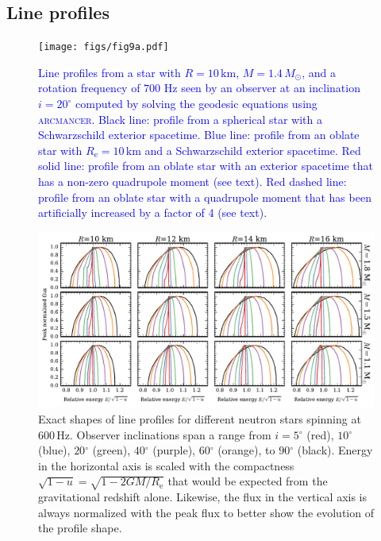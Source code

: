 \documentclass{aa}
\newcommand{\refe}[1]{\textcolor{blue}{{#1}}}
\newcommand{\Msun}{\ensuremath{M_{\odot}}}
\renewcommand{\deg}{\ensuremath{^{\circ}}}
\begin{document}
\subsection{Line profiles}

\begin{figure}
\texttt{[image: figs/fig9a.pdf]}
\caption{\label{fig:line_profiles}
    \refe{
Line profiles from a star with $R = 10\,\mathrm{km}$, $M = 1.4\,\Msun$, and a rotation frequency of $700$ Hz seen by an observer at an inclination $i = 20^{\circ}$ \refe{computed by solving the geodesic equations using \textsc{arcmancer}}.
Black line: profile from a spherical star with a Schwarzschild exterior spacetime. 
Blue line: profile from an oblate star with $R_{\mathrm{e}} = 10\,\mathrm{km}$ and a Schwarzschild exterior spacetime. 
Red solid line: profile from an oblate star with an exterior spacetime that has a non-zero quadrupole moment (see text). 
    Red dashed line: profile from an oblate star with a quadrupole moment that has been artificially increased by a factor of 4 (see text).
    }
}
\end{figure}



\begin{figure}[htbp!]
\centering
    \includegraphics[width=18cm]{figs/sweep_grid.pdf}
\caption{\label{fig:sweep}
    Exact shapes of line profiles for different neutron stars spinning at $600\,\mathrm{Hz}$.
Observer inclinations span a range from $i=5\deg$ (red), $10\deg$ (blue), $20\deg$ (green), $40\deg$ (purple), $60\deg$ (orange), to $90\deg$ (black).
Energy in the horizontal axis is scaled with the compactness $\sqrt{1-u} = \sqrt{1-2GM/R_{\mathrm{e}}}$ that would be expected from the gravitational redshift alone.
Likewise, the flux in the vertical axis is always normalized with the peak flux to better show the evolution of the profile shape.
}
\end{figure}
\end{document}
